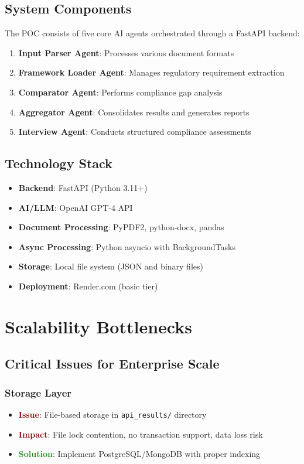 \documentclass[12pt,a4paper]{report}
\begin{document}
\subsection{System Components}

The POC consists of five core AI agents orchestrated through a FastAPI backend:

\begin{enumerate}
    \item \textbf{Input Parser Agent}: Processes various document formats
    \item \textbf{Framework Loader Agent}: Manages regulatory requirement extraction
    \item \textbf{Comparator Agent}: Performs compliance gap analysis
    \item \textbf{Aggregator Agent}: Consolidates results and generates reports
    \item \textbf{Interview Agent}: Conducts structured compliance assessments
\end{enumerate}

\subsection{Technology Stack}
\begin{itemize}
    \item \textbf{Backend}: FastAPI (Python 3.11+)
    \item \textbf{AI/LLM}: OpenAI GPT-4 API
    \item \textbf{Document Processing}: PyPDF2, python-docx, pandas
    \item \textbf{Async Processing}: Python asyncio with BackgroundTasks
    \item \textbf{Storage}: Local file system (JSON and binary files)
    \item \textbf{Deployment}: Render.com (basic tier)
\end{itemize}

\section{Scalability Bottlenecks}

\subsection{Critical Issues for Enterprise Scale}

\subsubsection{Storage Layer}
\begin{itemize}
    \item \textcolor{darkred}{\textbf{Issue}}: File-based storage in \texttt{api\_results/} directory
    \item \textcolor{darkred}{\textbf{Impact}}: File lock contention, no transaction support, data loss risk
    \item \textcolor{forestgreen}{\textbf{Solution}}: Implement PostgreSQL/MongoDB with proper indexing
\end{itemize}
\end{document}
